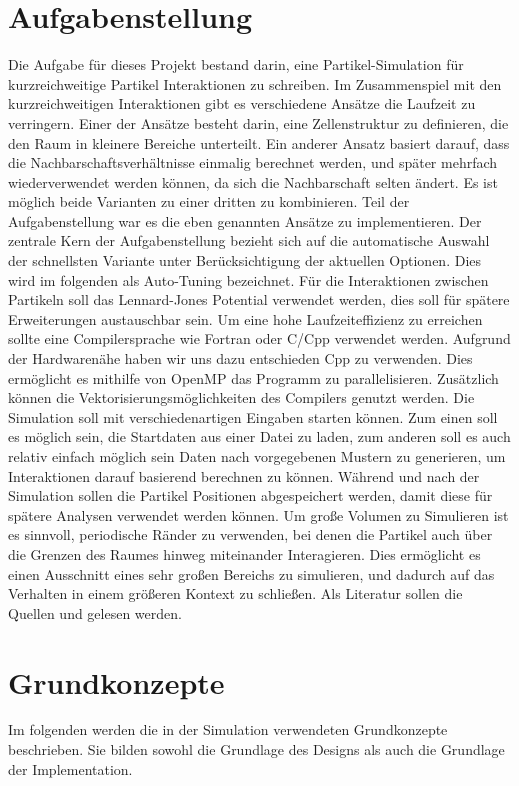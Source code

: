 \documentclass[
12pt,
a4paper,
BCOR10mm,
DIV14,
headsepline,
]{scrreprt}
\begin{document}
	\chapter{Aufgabenstellung}%
	\label{Aufgabenstellung}
	Die Aufgabe für dieses Projekt bestand darin, eine Partikel-Simulation für kurzreichweitige Partikel Interaktionen zu schreiben. Im Zusammenspiel mit den kurzreichweitigen Interaktionen gibt es verschiedene Ansätze die Laufzeit zu verringern. Einer der Ansätze besteht darin, eine Zellenstruktur zu definieren, die den Raum in kleinere Bereiche unterteilt. Ein anderer Ansatz basiert darauf, dass die Nachbarschaftsverhältnisse einmalig berechnet werden, und später mehrfach wiederverwendet werden können, da sich die Nachbarschaft selten ändert. Es ist möglich beide Varianten zu einer dritten zu kombinieren. Teil der Aufgabenstellung war es die eben genannten Ansätze zu implementieren. Der zentrale Kern der Aufgabenstellung bezieht sich auf die automatische Auswahl der schnellsten Variante unter Berücksichtigung der aktuellen Optionen. Dies wird im folgenden als Auto-Tuning bezeichnet. Für die Interaktionen zwischen Partikeln soll das Lennard-Jones Potential verwendet werden, dies soll für spätere Erweiterungen austauschbar sein. Um eine hohe Laufzeiteffizienz zu erreichen sollte eine Compilersprache wie Fortran oder C/Cpp verwendet werden. Aufgrund der Hardwarenähe haben wir uns dazu entschieden Cpp zu verwenden. Dies ermöglicht es mithilfe von OpenMP das Programm zu parallelisieren. Zusätzlich können die Vektorisierungsmöglichkeiten des Compilers genutzt werden. Die Simulation soll mit verschiedenartigen Eingaben starten können. Zum einen soll es möglich sein, die Startdaten aus einer Datei zu laden, zum anderen soll es auch relativ einfach möglich sein Daten nach vorgegebenen Mustern zu generieren, um Interaktionen darauf basierend berechnen zu können. Während und nach der Simulation sollen die Partikel Positionen abgespeichert werden, damit diese für spätere Analysen verwendet werden können. Um große Volumen zu Simulieren ist es sinnvoll, periodische Ränder zu verwenden, bei denen die Partikel auch über die Grenzen des Raumes hinweg miteinander Interagieren. Dies ermöglicht es einen Ausschnitt eines sehr großen Bereichs zu simulieren, und dadurch auf das Verhalten in einem größeren Kontext zu schließen. Als Literatur sollen die Quellen \cite{NumerischeSimulationInDerMolekuldynamic} und \cite{DCRapaport} gelesen werden.
	\chapter{Grundkonzepte}%
	\label{Grundkonzepte}
	Im folgenden werden die in der Simulation verwendeten Grundkonzepte beschrieben. Sie bilden sowohl die Grundlage des Designs als auch die Grundlage der Implementation.
\end{document}
